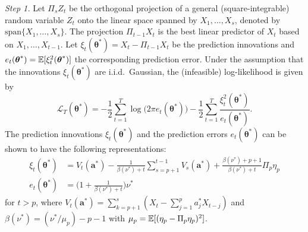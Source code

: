 \textit{Step 1.} Let $\Pi_s Z_t$ be the orthogonal projection of a general (square-integrable) random variable $Z_t$ onto the linear space spanned by $X_1,\ldots,X_s$, denoted by $\text{span}\{X_1,\ldots,X_s\}$. The projection $\Pi_{t-1} X_t$ is the best linear predictor of $X_t$ based on $X_1,\ldots,X_{t-1}$. Let $\xi_t(\boldsymbol{\theta}^*) = X_t - \Pi_{t-1} X_t$ be the prediction innovations and $e_t(\boldsymbol{\theta}^*) = \mathbb{E}[ \xi_t^2(\boldsymbol{\theta}^*)]$ the corresponding prediction error. Under the assumption that the innovations $\xi_t(\boldsymbol{\theta}^*)$ are i.i.d.\ Gaussian, the (infeasible) log-likelihood is given by  
\[ \mathcal{L}_T(\boldsymbol{\theta}^*) = -\frac{1}{2} \sum\limits_{t=1}^T \log \big(2 \pi e_t(\boldsymbol{\theta}^*)\big) - \frac{1}{2} \sum\limits_{t=1}^T \frac{\xi_t^2(\boldsymbol{\theta}^*)}{e_t(\boldsymbol{\theta}^*)}. \]
The prediction innovations $\xi_t(\boldsymbol{\theta}^*)$ and the prediction errors $e_t(\boldsymbol{\theta}^*)$ can be shown to have the following representations:  
\begin{align}
\xi_t(\boldsymbol{\theta}^*) & = V_t(\boldsymbol{a}^*) - \frac{1}{\beta(\nu^*) + t} \sum\limits_{s=p+1}^{t-1} V_s(\boldsymbol{a}^*) + \frac{\beta(\nu^*)+p+1}{\beta(\nu^*) + t} \Pi_p \eta_p \label{eq-pred-innovation} \\
e_t(\boldsymbol{\theta}^*)   & = \Big( 1 + \frac{1}{\beta(\nu^*)+t} \Big) \nu^* \label{eq-pred-error} 
\end{align}
for $t > p$, where $V_t(\boldsymbol{a}^*) = \sum_{k=p+1}^s (X_t - \sum_{j=1}^p a_j^* X_{t-j})$ and $\beta(\nu^*) = (\nu^*/\mu_p) - p - 1$ with $\mu_p = \mathbb{E}[(\eta_p - \Pi_p \eta_p)^2]$.
\vspace{10pt}



